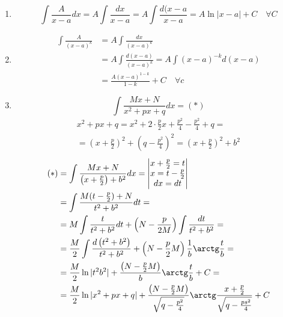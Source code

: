 \begin{enumerate}
  \item \[
  \int \frac{A}{x - a} dx = A \int \frac{dx}{x - a} = A \int \frac{d(x - a}{x - a} = A \ln |x - a| + C \quad \forall C
  \] 

  \item
    \begin{align*}
      \int \frac{A}{(x - a)^k} &= A \int \frac{dx}{(x - a)^k} \\
        &= A \int \frac{d(x - a)}{(x - a)^k} = A \int (x - a)^{-k} d(x - a) \\
        &= \frac{A (x - a)^{1 - k}}{1 - k} + C \quad \forall c
    \end{align*}

  \item \[
      \int \frac{Mx + N}{x^2 + px + q} dx = (*)
  \] 
    \begin{gather*}
      x^2 + px + q = x^2 + 2\cdot \frac{p}{2}x + \frac{p^2}{4} - \frac{p^2}{4} + q = \\
      = \left( x + \frac{p}{2} \right) ^2 + \left( q - \frac{p^2}{4} \right) ^2 = \left( x + \frac{p}{2} \right) ^2 + b^2
    \end{gather*}
    \begin{align*}
      (*) &= \int \frac{Mx + N}{\left( x + \frac{p}{2} \right) + b^2} dx = 
      \begin{vmatrix} 
        x + \frac{p}{2} = t \\
        x = t - \frac{p}{2} \\
        dx = dt
      \end{vmatrix} \\ 
          &= \int \frac{M(t - \frac{p}{2}) + N}{t^2 + b^2} dt = \\
          &= M \int \frac{t}{t^2 + b^2}dt + \left(N - \frac{p}{2 M}\right) \int \frac{dt}{t^2 + b^2} = \\
          &= \frac{M}{2} \int \frac{d\left( t^2 + b^2 \right)}{t^2 + b^2} + \left( N - \frac{p}{2} M \right) \frac{1}{b} \arctg \frac{t}{b} = \\
          &= \frac{M}{2} \ln|t^2  b^2| + \frac{\left( N - \frac{p}{2} M \right) }{b} \arctg \frac{t}{b} + C = \\
          &= \frac{M}{2} \ln |x^2 + px + q| + \frac{\left( N - \frac{p}{2} M \right) }{\sqrt{q - \frac{p^2}{4}} } \arctg \frac{x + \frac{p}{2}}{\sqrt{q - \frac{ps^2}{4}} } + C
    \end{align*}
\end{enumerate}


